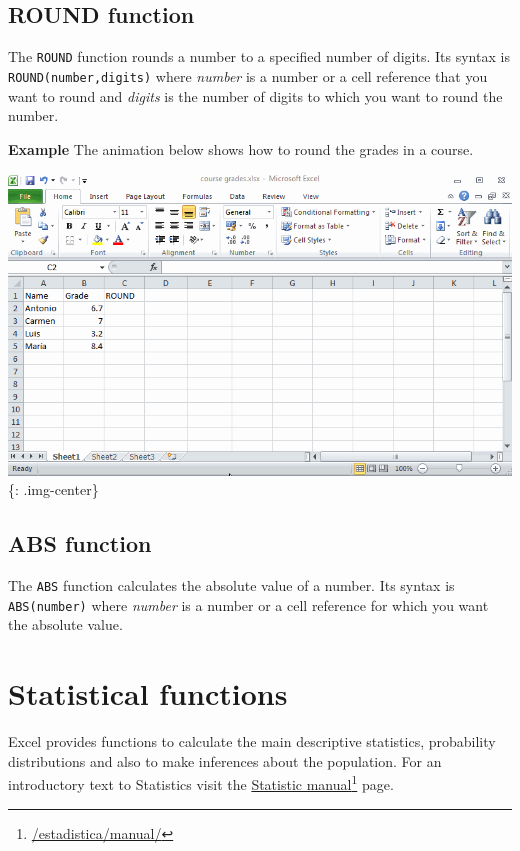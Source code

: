 \section{ROUND function}
\label{roundfunction}

The \texttt{ROUND} function rounds a number to a specified number of digits. Its syntax is \texttt{ROUND(number,digits)} where \emph{number} is a number or a cell reference that you want to round and \emph{digits} is the number of digits to which you want to round the number. 

\textbf{Example} The animation below shows how to round the grades in a course.

\includegraphics[keepaspectratio,width=\textwidth,height=0.75\textheight]{img/example_function_round.gif}
\{: .img-center\}

\section{ABS function}
\label{absfunction}

The \texttt{ABS} function calculates the absolute value of a number. Its syntax is \texttt{ABS(number)} where \emph{number} is a number or a cell reference for which you want the absolute value. 

\chapter{Statistical functions}
\label{statisticalfunctions}

Excel provides functions to calculate the main descriptive statistics, probability distributions and also to make inferences about the population.
For an introductory text to Statistics visit the \href{/estadistica/manual/}{Statistic manual}\footnote{\href{/estadistica/manual/}{\slash estadistica\slash manual\slash }} page. 


